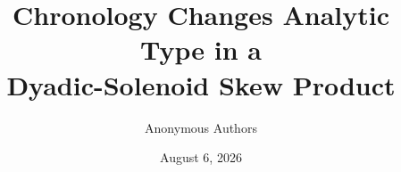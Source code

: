 \documentclass[11pt]{article}
\title{Chronology Changes Analytic Type in a\\
Dyadic-Solenoid Skew Product}
\author{Anonymous Authors}
\date{August 6, 2026}
\theoremstyle{definition}
\theoremstyle{remark}
\begin{document}
\maketitle
\begin{abstract}

\end{abstract}









\appendix





\end{document}
